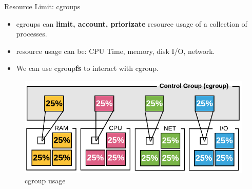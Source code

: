 \begin{frame}{Resource Limit: cgroups}
    \begin{itemize}
        \item cgroups can \textbf{limit, account, priorizate} resource usage of a collection of processes.
        \pause
        \item resource usage can be: CPU Time, memory, disk I/O, network.
        \pause
        \item We can use cgroup\textbf{fs} to interact with cgroup.
    \end{itemize}
    
    \pause
            \begin{figure}
        \includegraphics[width=.8\textwidth]{assets/cgroup.png}
                \caption{cgroup usage}

            \end{figure}
\end{frame}